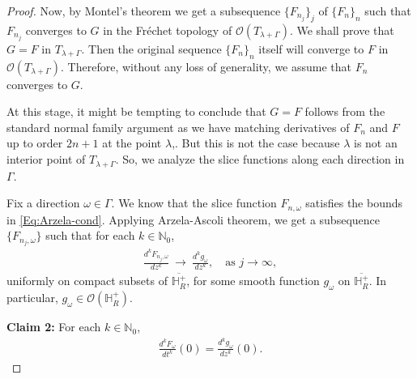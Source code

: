 \documentclass[10pt,a4paper]{amsart}
\begin{document}
\begin{proof}
\vspace{2mm}

Now, by Montel's theorem we get a subsequence $\{F_{n_j}\}_j$ of $\{F_n\}_n$ such that $F_{n_j}$ converges to $G$ in the Fr\'echet topology of $\mathcal{O}(T_{\lambda+\Gamma})$. We shall prove that $G=F$ in $T_{\lambda + \Gamma}$. Then the original sequence $\{F_n\}_n$ itself will converge to $F$ in $\mathcal{O}(T_{\lambda+\Gamma})$. Therefore, without any loss of generality, we assume that $F_n$ converges to $G$. 

At this stage, it might be tempting to conclude that $G=F$ follows from the standard normal family argument as we have matching derivatives of $F_n$ and $F$ up to order $2n+1$ at the point $\lambda$,. But this is not the case because $\lambda$ is not an interior point of $T_{\lambda +\Gamma}$. So, we analyze the slice functions along each direction in $\Gamma$.

Fix a direction $\omega \in \Gamma$. We know that the slice function $F_{n, \omega}$ satisfies the bounds in \eqref{Eq:Arzela-cond}. Applying Arzela-Ascoli theorem, we get a subsequence $\{F_{n_j, \omega}\}$ such that for each $k\in \mathbb{N}_0$,
\begin{align}\label{Eq:Arzela-Ascoli}
\frac{d^k F_{n_j, \omega}}{dz^k} \  \rightarrow \ \frac{d^k g_\omega} {dz^k}, \quad \text{as } j\to \infty,
\end{align}
uniformly on compact subsets of $\overline{\mathbb{H}^+_R}$, for some smooth function $g_\omega$ on $\overline{\mathbb{H}^+_R}$. In particular, $g_\omega \in \mathcal{O}(\mathbb{H}^+_R)$.

\vspace{2mm}

\noindent \textbf{Claim 2:} For each $k\in \mathbb{N}_0$,
\begin{align}\label{Eq:equal-derivatives}
    \frac{d^k F_\omega}{dt^k}(0) = \frac{d^k g_\omega}{dz^k}(0).
\end{align}


\end{proof}
\end{document}
